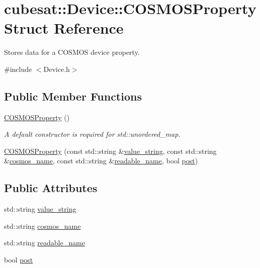 \hypertarget{structcubesat_1_1Device_1_1COSMOSProperty}{}\section{cubesat\+:\+:Device\+:\+:C\+O\+S\+M\+O\+S\+Property Struct Reference}
\label{structcubesat_1_1Device_1_1COSMOSProperty}


Stores data for a C\+O\+S\+M\+OS device property.  




{\ttfamily \#include $<$Device.\+h$>$}

\subsection*{Public Member Functions}
\begin{DoxyCompactItemize}
\item 
\hyperlink{structcubesat_1_1Device_1_1COSMOSProperty_afa58eec624712438b9e76916df9ce710}{C\+O\+S\+M\+O\+S\+Property} ()
\begin{DoxyCompactList}\small\item\em A default constructor is required for std\+::unordered\+\_\+map. \end{DoxyCompactList}\item 
\hyperlink{structcubesat_1_1Device_1_1COSMOSProperty_a5184451480bc582aa79a1ce4f95c28ae}{C\+O\+S\+M\+O\+S\+Property} (const std\+::string \&\hyperlink{structcubesat_1_1Device_1_1COSMOSProperty_aea51c93fa454ff577b22c67b557d512c}{value\+\_\+string}, const std\+::string \&\hyperlink{structcubesat_1_1Device_1_1COSMOSProperty_adb17f613327465af2bd9995997627a4b}{cosmos\+\_\+name}, const std\+::string \&\hyperlink{structcubesat_1_1Device_1_1COSMOSProperty_a6ebd971f5ac943dfa6ef3ce3973e7233}{readable\+\_\+name}, bool \hyperlink{structcubesat_1_1Device_1_1COSMOSProperty_ac7babef9394856270b1d9b866a6750b3}{post})
\end{DoxyCompactItemize}
\subsection*{Public Attributes}
\begin{DoxyCompactItemize}
\item 
std\+::string \hyperlink{structcubesat_1_1Device_1_1COSMOSProperty_aea51c93fa454ff577b22c67b557d512c}{value\+\_\+string}
\item 
std\+::string \hyperlink{structcubesat_1_1Device_1_1COSMOSProperty_adb17f613327465af2bd9995997627a4b}{cosmos\+\_\+name}
\item 
std\+::string \hyperlink{structcubesat_1_1Device_1_1COSMOSProperty_a6ebd971f5ac943dfa6ef3ce3973e7233}{readable\+\_\+name}
\item 
bool \hyperlink{structcubesat_1_1Device_1_1COSMOSProperty_ac7babef9394856270b1d9b866a6750b3}{post}
\end{DoxyCompactItemize}


